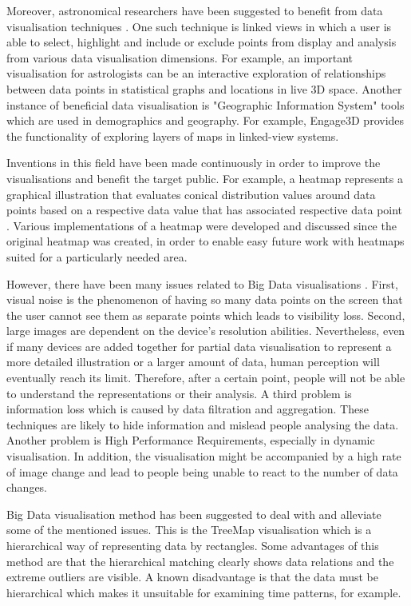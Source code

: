 \documentclass{l4proj}
\begin{document}
Moreover, astronomical researchers have been suggested to benefit from data visualisation techniques \cite{goodman2012principles}. One such technique is linked views in which a user is able to select, highlight and include or exclude points from display and analysis from various data visualisation dimensions. For example, an important visualisation for astrologists can be an interactive exploration of relationships between data points in statistical graphs and locations in live 3D space. Another instance of beneficial data visualisation is "Geographic Information System" tools which are used in demographics and geography. For example, Engage3D provides the functionality of exploring layers of maps in linked-view systems. 

Inventions in this field have been made continuously in order to improve the visualisations and benefit the target public. For example, a heatmap represents a graphical illustration that evaluates conical distribution values around data points based on a respective data value that has associated respective data point \cite{cardno2014data}. Various implementations of a heatmap were developed and discussed since the original heatmap was created, in order to enable easy future work with heatmaps suited for a particularly needed area.

However, there have been many issues related to Big Data visualisations \cite{gorodov2013analytical}. First, visual noise is the phenomenon of having so many data points on the screen that the user cannot see them as separate points which leads to visibility loss. Second, large images are dependent on the device's resolution abilities. Nevertheless, even if many devices are added together for partial data visualisation to represent a more detailed illustration or a larger amount of data, human perception will eventually reach its limit. Therefore, after a certain point, people will not be able to understand the representations or their analysis. A third problem is information loss which is caused by data filtration and aggregation. These techniques are likely to hide information and mislead people analysing the data. Another problem is High Performance Requirements, especially in dynamic visualisation. In addition, the visualisation might be accompanied by a high rate of image change and lead to people being unable to react to the number of data changes. 

Big Data visualisation method has been suggested  to deal with and alleviate some of the mentioned issues. This is the TreeMap visualisation \cite{gorodov2013analytical} which is a hierarchical way of representing data by rectangles. Some advantages of this method are that the hierarchical matching clearly shows data relations and the extreme outliers are visible. A known  disadvantage is that the data must be hierarchical which makes it unsuitable for examining time patterns, for example. 
\end{document}
